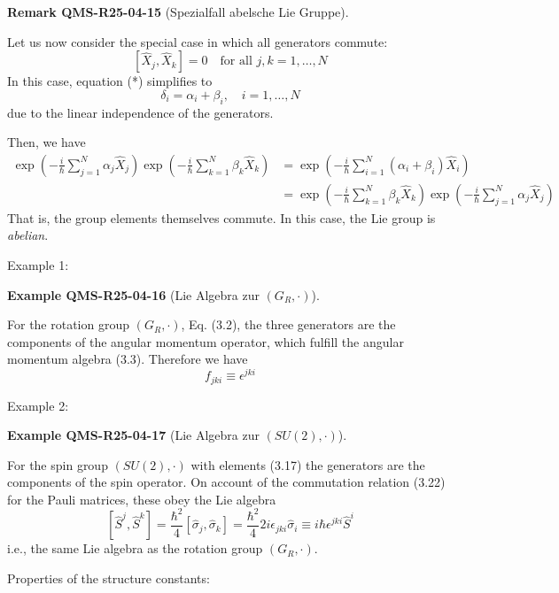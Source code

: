 \documentclass[10pt, letterpaper]{article}
\newcommand{\CustomHeading}[3]{%
  \par\medskip\noindent%
  \textbf{#1 #2} \textnormal{(#3)}.\enskip%
}
\newenvironment{REM}[2]{\begin{unitbox}\CustomHeading{Remark}{#1}{#2}}{\end{unitbox}}
\newenvironment{EXA}[2]{\begin{unitbox}\CustomHeading{Example}{#1}{#2}}{\end{unitbox}}
\begin{document}
\begin{REM}{QMS-R25-04-15}{Spezialfall abelsche Lie Gruppe}
Let us now consider the special case in which all generators commute:
\[
[\hat{X}_{j}, \hat{X}_{k}] = 0 \quad \text{for all } j,k = 1, \ldots, N
\]
In this case, equation (*) simplifies to
\[
\delta_{i} = \alpha_{i} + \beta_{i}, \quad i = 1, \ldots, N
\]
due to the linear independence of the generators.

Then, we have
\[
\begin{aligned}
\exp\left(-\frac{i}{\hbar} \sum_{j=1}^{N} \alpha_{j} \hat{X}_{j}\right) 
\exp\left(-\frac{i}{\hbar} \sum_{k=1}^{N} \beta_{k} \hat{X}_{k}\right)
&= \exp\left(-\frac{i}{\hbar} \sum_{i=1}^{N} (\alpha_{i} + \beta_{i}) \hat{X}_{i}\right) \\
&= \exp\left(-\frac{i}{\hbar} \sum_{k=1}^{N} \beta_{k} \hat{X}_{k}\right) 
\exp\left(-\frac{i}{\hbar} \sum_{j=1}^{N} \alpha_{j} \hat{X}_{j}\right)
\end{aligned}
\]
That is, the group elements themselves commute. In this case, the Lie group is \emph{abelian}.
\end{REM}



Example 1: 

\begin{EXA}{QMS-R25-04-16}{Lie Algebra zur $\left(G_{R}, \cdot\right)$}
For the rotation group $\left(G_{R}, \cdot\right)$, Eq. (3.2), the three generators are the components of the angular momentum operator, which fulfill the angular momentum algebra (3.3). Therefore we have
$$
f_{j k i} \equiv \epsilon^{j k i}
$$
\end{EXA}

Example 2: 

\begin{EXA}{QMS-R25-04-17}{Lie Algebra zur $(S U(2), \cdot)$}
For the spin group $(S U(2), \cdot)$ with elements (3.17) the generators are the components of the spin operator. On account of the commutation relation (3.22) for the Pauli matrices, these obey the Lie algebra
$$
\left[\hat{S}^{j}, \hat{S}^{k}\right]=\frac{\hbar^{2}}{4}\left[\hat{\sigma}_{j}, \hat{\sigma}_{k}\right]=\frac{\hbar^{2}}{4} 2 i \epsilon_{j k i} \hat{\sigma}_{i} \equiv i \hbar \epsilon^{j k i} \hat{S}^{i}
$$
i.e., the same Lie algebra as the rotation group $\left(G_{R}, \cdot\right)$.
\end{EXA}




Properties of the structure constants:
\end{document}
